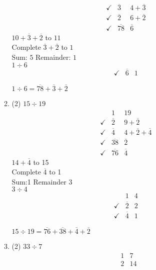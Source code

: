 \documentclass[12pt]{article}
\begin{document}
\begin{enumerate}[label=\textbf{\arabic*}.]
\begin{enumerate}
\begin{tasks}[label=]
\begin{align*}
            \checkmark&\overline{3} & 4 + \overline{3} \\
            \checkmark&\overline{2} & 6 + \overline{2} \\
            \checkmark&\overline{78} & \overline{6}
        \end{align*}
         $10 + \overline{3} + \overline{2}$ to $11$ \\
        Complete $\overline{3} + \overline{2}$ to $1$ \\
        Sum: $5$ Remainder: $1$\\
        $1 \div 6$
        \begin{align*}
            \checkmark&\overline{6} & 1
        \end{align*}
    \end{tasks}
    $1 \div 6 = \overline{78} + \overline{3} + \overline{2}$
    \item 
    \begin{tasks}[label] (2)
        \task$15 \div 19$
        \begin{align*}
            &1 & 19 \\
            \checkmark&\overline{2} & 9 + \overline{2} \\
            \checkmark&\overline{4} & 4 + \overline{2} + \overline{4} \\
            \checkmark&\overline{38} & \overline{2} \\
            \checkmark&\overline{76} & \overline{4} 
        \end{align*}
         $14 + \overline{4}$ to 15 \\
        Complete $\overline{4}$ to 1 \\
        Sum:1 Remainder 3 \\
        $3 \div 4$
        \begin{align*}
            &1 & 4 \\
            \checkmark&\overline{2} & 2 \\
            \checkmark&\overline{4} & 1
        \end{align*}
    \end{tasks}
    $15 \div 19 = \overline{76} + \overline{38} + \overline{4} + \overline{2}$
    \item 
    \begin{tasks}[label=] (2)
        \task$33 \div 7$
        \begin{align*}
            &1 & 7 \\
            &2 & 14 \\

\end{align*}
\end{tasks}
\end{enumerate}
\end{enumerate}
\end{document}
